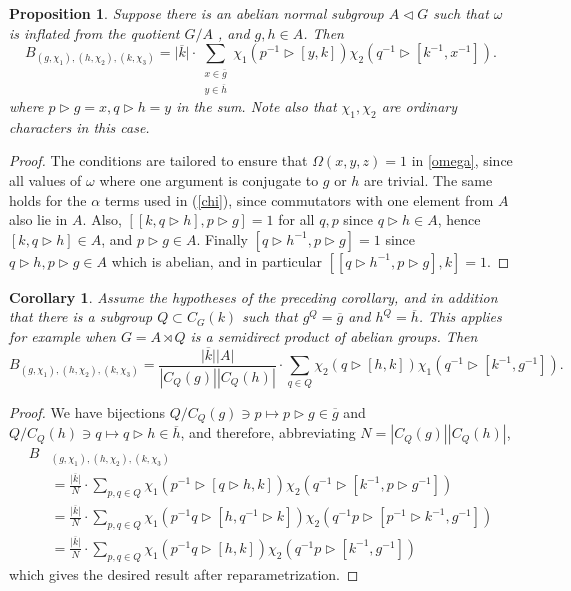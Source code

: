 \documentclass[a4paper, 10pt]{book}
\newtheorem{Prop}[theorem]{Proposition}
\newtheorem{Cor}[theorem]{Corollary}
\theoremstyle{definition}
\numberwithin{equation}{chapter}
\newcommand\ol[1]{\overline{#1}}
\newcommand\hit{\triangleright}
\newcommand\inv{^{-1}}
\newcommand\semdir{\rtimes}
\begin{document}
\begin{Prop} Suppose there is an abelian normal subgroup $A\triangleleft G$ such that  $\omega$ is inflated from the quotient $G/A$ , and $g,h\in A$. Then
  \begin{equation}
    \label{eq:simplified}
    B_{(g,\chi_1),(h,\chi_2),(k,\chi_3)}=\vert \overline k \vert \cdot \sum_{\substack{x\in \overline g\\y\in\overline h}}\chi_1(p\inv\hit[y,k])\chi_2(q\inv\hit[k\inv,x\inv]).
  \end{equation}
  where $p\hit g=x,q\hit h=y$ in the sum. Note also that $\chi_1,\chi_2$ are ordinary characters in this case.
\end{Prop}
\begin{proof}
  The conditions are tailored to ensure that $\Omega(x,y,z)=1$ in \ref{omega}, since all values of $\omega$ where one argument is conjugate to $g$ or $h$ are trivial. The same holds for the $\alpha$ terms used in (\cref{chi}), since commutators with one element from $A$ also lie in $A$. Also, $[[k,q\hit h],p\hit g]=1$ for all $q,p$ since $q\hit h\in A$, hence $[k,q\hit h]\in A$, and $p\hit g\in A$. Finally $[q\hit h\inv,p\hit g]=1$ since $q\hit h,p\hit g\in A$ which is abelian, and in particular $[[q\hit h\inv,p\hit g],k]=1$.
\end{proof}
\begin{Cor}\label{Cor:verysimplified}
  Assume the hypotheses of the preceding corollary, and in addition that there is a subgroup $Q\subset C_G(k)$ such that $g^Q=\overline g$ and $h^Q=\overline h$. This applies for example when $G=A\semdir Q$ is a semidirect product of abelian groups. Then
  \begin{equation}
    \label{eq:verysimplified}
    B_{(g,\chi_1),(h,\chi_2),(k,\chi_3)}=\frac{\vert \ol k \vert |A|}{|C_Q(g)||C_Q(h)|} \cdot\sum_{q\in Q}\chi_2(q\hit[h,k])\chi_1(q\inv\hit[k\inv,g\inv]).
  \end{equation}
\end{Cor}
\begin{proof}
  We have bijections $Q/C_Q(g)\ni p\mapsto p\hit g\in \ol g$ and $Q/C_Q(h)\ni q\mapsto q\hit h\in \ol h$, and therefore, abbreviating $N=|C_Q(g)||C_Q(h)|$,
  \begin{align*}
    B&_{(g,\chi_1),(h,\chi_2),(k,\chi_3)}\\&=\frac{\vert\ol k  \vert}N \cdot \sum_{p,q\in Q}\chi_1(p\inv\hit[q\hit h,k])\chi_2(q\inv\hit[k\inv,p\hit g\inv])\\
                                        &=\frac{\vert\ol k  \vert}N \cdot\sum_{p,q\in Q}\chi_1(p\inv q\hit[h,q\inv\hit k])\chi_2(q\inv p\hit[p\inv \hit k\inv,g\inv])\\
                                        &=\frac{\vert\ol k  \vert}N\cdot\sum_{p,q\in Q}\chi_1(p\inv q\hit[h,k])\chi_2(q\inv p\hit[k\inv,g\inv])
  \end{align*}
  which gives the desired result after reparametrization.
\end{proof}
\end{document}

